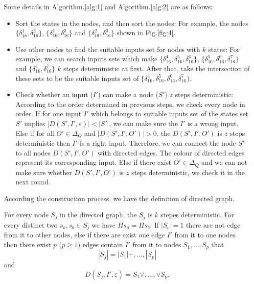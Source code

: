 Some details in Algorithm.\ref{alg:1} and Algorithm.\ref{alg:2} are as follows:
\begin{itemize}
 \item Sort the states in the nodes, and then sort the nodes: For example, the nodes $\{\delta_{16}^1,\delta_{16}^2\}$, $\{\delta_{16}^1,\delta_{16}^3\}$ and $\{\delta_{16}^2,\delta_{16}^3\}$ shown in Fig.\ref{fig:4}. 
  \item Use other nodes to find the suitable inputs set for nodes with $k$ states: For example, we can search inputs sets which make $\{\delta_{16}^4,\delta_{16}^5,\delta_{16}^6\}$, $\{\delta_{16}^5,\delta_{16}^6,\delta_{16}^7\}$ and $\{\delta_{16}^4,\delta_{16}^7\}$ $k$ steps deterministic at first. After that, take the intersection of these sets to be the suitable inputs set of $\{\delta_{16}^4,\delta_{16}^5,\delta_{16}^6,\delta_{16}^7\}$. 
  \item Check whether an input ($I'$) can make a node ($S'$) $z$ steps deterministic: According to the order determined in previous steps, we check every node in order. If for one input $I'$ which belongs to suitable inputs set of the states set $S'$ implies $|D\left(S',I',\varepsilon\right)|<|S'|$, we can make sure the $I'$ is a wrong input. Else if for all $O' \in \Delta_Q$ and $|D\left(S',I',O'\right)|>0$, the $D\left(S',I',O'\right)$ is $z$ steps deterministic then $I'$ is a right input. Therefore, we can connect the node $S'$ to all nodes $D\left(S',I',O'\right)$ with directed edges. The colour of directed edges represent its corresponding input. Else if there exist $O' \in \Delta_Q$ and we can not make sure whether $D\left(S',I',O'\right)$ is $z$ steps deterministic, we check it in the next round. 
\end{itemize} 

According the construction process, we have the definition of directed graph.
\begin{definition}
For every node $S_j$ in the directed graph, the $S_j$ is $k$ stepes deterministic. For every distinct two $s_a, s_b \in S_j$ we have $Hs_a=Hs_b$. If $|S_i|=1$ there are not edge from it to other nodes, else if there are exist one edge $I'$ from it to one nodes then there exist $p$ ($p\ge 1)$ edges contain $I'$ from it to nodes $S_1,\ldots,S_p$ that \[|S_j|= |S_1|+,\ldots,|S_p|\] and \[D\left(S_j,I',\varepsilon\right)=S_1\vee,\ldots,\vee S_p.\]
\end{definition}


